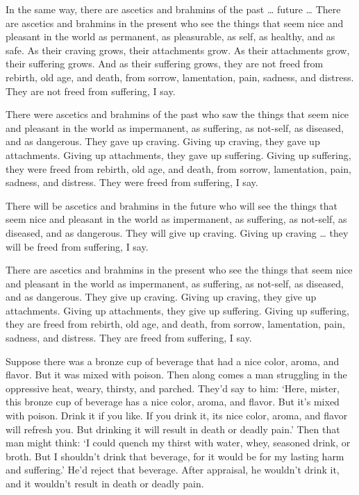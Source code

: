 \documentclass[12pt,openany]{book}%
\begin{document}
In the same way, there are ascetics and brahmins of the past … future … There are ascetics and brahmins in the present who see the things that seem nice and pleasant in the world as permanent, as pleasurable, as self, as healthy, and as safe. As their craving grows, their attachments grow. As their attachments grow, their suffering grows. And as their suffering grows, they are not freed from rebirth, old age, and death, from sorrow, lamentation, pain, sadness, and distress. They are not freed from suffering, I say. 

There were ascetics and brahmins of the past who saw the things that seem nice and pleasant in the world as impermanent, as suffering, as not-self, as diseased, and as dangerous. They gave up craving. Giving up craving, they gave up attachments. Giving up attachments, they gave up suffering. Giving up suffering, they were freed from rebirth, old age, and death, from sorrow, lamentation, pain, sadness, and distress. They were freed from suffering, I say. 

There will be ascetics and brahmins in the future who will see the things that seem nice and pleasant in the world as impermanent, as suffering, as not-self, as diseased, and as dangerous. They will give up craving. Giving up craving … they will be freed from suffering, I say. 

There are ascetics and brahmins in the present who see the things that seem nice and pleasant in the world as impermanent, as suffering, as not-self, as diseased, and as dangerous. They give up craving. Giving up craving, they give up attachments. Giving up attachments, they give up suffering. Giving up suffering, they are freed from rebirth, old age, and death, from sorrow, lamentation, pain, sadness, and distress. They are freed from suffering, I say. 

Suppose there was a bronze cup of beverage that had a nice color, aroma, and flavor. But it was mixed with poison. Then along comes a man struggling in the oppressive heat, weary, thirsty, and parched. They’d say to him: ‘Here, mister, this bronze cup of beverage has a nice color, aroma, and flavor. But it’s mixed with poison. Drink it if you like. If you drink it, its nice color, aroma, and flavor will refresh you. But drinking it will result in death or deadly pain.’ Then that man might think: ‘I could quench my thirst with water, whey, seasoned drink, or broth. But I shouldn’t drink that beverage, for it would be for my lasting harm and suffering.’ He’d reject that beverage. After appraisal, he wouldn’t drink it, and it wouldn’t result in death or deadly pain. 
\end{document}
